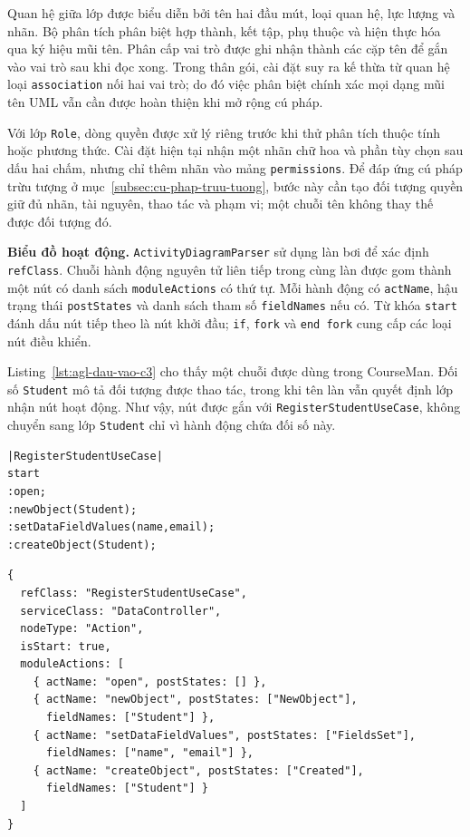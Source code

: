 Quan hệ giữa lớp được biểu diễn bởi tên hai đầu mút, loại quan hệ, lực lượng và nhãn. Bộ phân tích phân biệt hợp thành, kết tập, phụ thuộc và hiện thực hóa qua ký hiệu mũi tên. Phân cấp vai trò được ghi nhận thành các cặp tên để gắn vào vai trò sau khi đọc xong. Trong thân gói, cài đặt suy ra kế thừa từ quan hệ loại \texttt{association} nối hai vai trò; do đó việc phân biệt chính xác mọi dạng mũi tên UML vẫn cần được hoàn thiện khi mở rộng cú pháp.

Với lớp \texttt{Role}, dòng quyền được xử lý riêng trước khi thử phân tích thuộc tính hoặc phương thức. Cài đặt hiện tại nhận một nhãn chữ hoa và phần tùy chọn sau dấu hai chấm, nhưng chỉ thêm nhãn vào mảng \texttt{permissions}. Để đáp ứng cú pháp trừu tượng ở mục~\ref{subsec:cu-phap-truu-tuong}, bước này cần tạo đối tượng quyền giữ đủ nhãn, tài nguyên, thao tác và phạm vi; một chuỗi tên không thay thế được đối tượng đó.

\textbf{Biểu đồ hoạt động.} \texttt{ActivityDiagramParser} sử dụng làn bơi để xác định \texttt{refClass}. Chuỗi hành động nguyên tử liên tiếp trong cùng làn được gom thành một nút có danh sách \texttt{moduleActions} có thứ tự. Mỗi hành động có \texttt{actName}, hậu trạng thái \texttt{postStates} và danh sách tham số \texttt{fieldNames} nếu có. Từ khóa \texttt{start} đánh dấu nút tiếp theo là nút khởi đầu; \texttt{if}, \texttt{fork} và \texttt{end fork} cung cấp các loại nút điều khiển.

Listing~\ref{lst:agl-dau-vao-c3} cho thấy một chuỗi được dùng trong CourseMan. Đối số \texttt{Student} mô tả đối tượng được thao tác, trong khi tên làn vẫn quyết định lớp nhận nút hoạt động. Như vậy, nút được gắn với \texttt{RegisterStudentUseCase}, không chuyển sang lớp \texttt{Student} chỉ vì hành động chứa đối số này.

\begin{lstlisting}[language=PlantUML,caption={Chuỗi hành động đầu vào của ca sử dụng đăng ký sinh viên},label={lst:agl-dau-vao-c3}]
|RegisterStudentUseCase|
start
:open;
:newObject(Student);
:setDataFieldValues(name,email);
:createObject(Student);
\end{lstlisting}

\begin{lstlisting}[caption={Các trường chính của nút hoạt động sau phân tích},label={lst:agl-node-c3}]
{
  refClass: "RegisterStudentUseCase",
  serviceClass: "DataController",
  nodeType: "Action",
  isStart: true,
  moduleActions: [
    { actName: "open", postStates: [] },
    { actName: "newObject", postStates: ["NewObject"],
      fieldNames: ["Student"] },
    { actName: "setDataFieldValues", postStates: ["FieldsSet"],
      fieldNames: ["name", "email"] },
    { actName: "createObject", postStates: ["Created"],
      fieldNames: ["Student"] }
  ]
}
\end{lstlisting}

